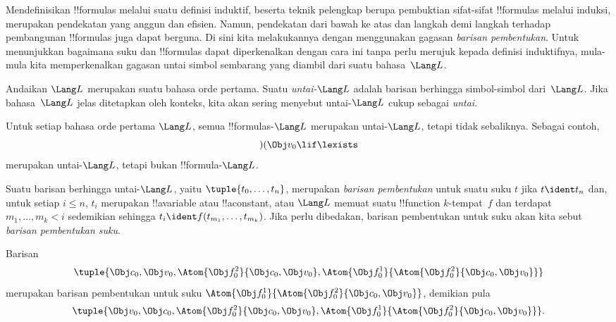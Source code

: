 \documentclass[../../../include/open-logic-section]{subfiles}
\begin{document}


Mendefinisikan !!{formula}s melalui suatu definisi induktif, beserta teknik
pelengkap berupa pembuktian sifat-sifat !!{formula}s melalui induksi,
merupakan pendekatan yang anggun dan efisien. Namun, pendekatan dari bawah
ke atas dan langkah demi langkah terhadap pembangunan !!{formula}s juga
dapat berguna. Di sini kita melakukannya dengan menggunakan gagasan
\emph{barisan pembentukan}.
%
Untuk menunjukkan bagaimana suku dan !!{formula}s dapat diperkenalkan dengan
cara ini tanpa perlu merujuk kepada definisi induktifnya, mula-mula kita
memperkenalkan gagasan untai simbol sembarang yang diambil dari suatu
bahasa~$\Lang L$.

\begin{defn}[Untai]
Andaikan $\Lang L$ merupakan suatu bahasa orde pertama. Suatu
\emph{untai-$\Lang L$} adalah barisan berhingga simbol-simbol dari~$\Lang L$.
Jika bahasa~$\Lang L$ jelas ditetapkan oleh konteks, kita akan sering
menyebut untai-$\Lang L$ cukup sebagai \emph{untai}.
\end{defn}

\begin{ex}
Untuk setiap bahasa orde pertama $\Lang L$, semua
!!{formula}s-$\Lang L$ merupakan untai-$\Lang L$, tetapi tidak sebaliknya.
Sebagai contoh, 
\[)(\Obj v_0\lif\lexists\]
merupakan untai-$\Lang L$, tetapi bukan !!{formula}-$\Lang L$.
\end{ex}

\begin{defn}
Suatu barisan berhingga untai-$\Lang L$, yaitu
$\tuple{t_0,\dotsc,t_n}$, merupakan \emph{barisan pembentukan} untuk suatu
suku $t$ jika $t \ident t_n$ dan, untuk setiap $i \leq n$, $t_i$ merupakan
!!a{variable} atau !!a{constant}, atau $\Lang L$ memuat suatu !!{function}
$k$-tempat~$f$ dan terdapat $m_1,\dotsc,m_k < i$ sedemikian sehingga
$t_i \ident f(t_{m_1},\dotsc,t_{m_k})$. Jika perlu dibedakan, barisan
pembentukan untuk suku akan kita sebut \emph{barisan pembentukan suku}.
\end{defn}

\begin{ex}
Barisan
\[
    \tuple{\Obj c_0, \Obj v_0, \Atom{\Obj f^2_0}{\Obj c_0, \Obj v_0}, \Atom{\Obj f^1_0}{\Atom{\Obj f^2_0}{\Obj c_0, \Obj v_0}}}
\]
merupakan barisan pembentukan untuk suku $\Atom{\Obj f^1_0}{\Atom{\Obj
f^2_0}{\Obj c_0, \Obj v_0}}$, demikian pula
\[
    \tuple{\Obj v_0, \Obj c_0, \Atom{\Obj f^2_0}{\Obj c_0, \Obj v_0}, \Atom{\Obj f^1_0}{\Atom{\Obj f^2_0}{\Obj c_0, \Obj v_0}}}.
\]
\end{ex}
\end{document}
